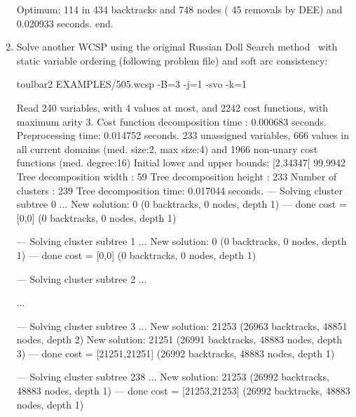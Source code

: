 \begin{enumerate}
{\begin{DoxyCode}
Optimum: 114 in 434 backtracks and 748 nodes ( 45 removals by DEE) and 0.020933 seconds.
end.
\end{DoxyCode}}
\item Solve another WCSP using the original Russian Doll Search method~\cite{Verfaillie96} with static variable
ordering (following problem file) and soft arc consistency:
\begin{DoxyCode}
	toulbar2 EXAMPLES/505.wcsp -B=3 -j=1 -svo -k=1
\end{DoxyCode}
{\scriptsize
\begin{DoxyCode}
Read 240 variables, with 4 values at most, and 2242 cost functions, with maximum arity 3.
Cost function decomposition time : 0.000683 seconds.
Preprocessing time: 0.014752 seconds.
233 unassigned variables, 666 values in all current domains (med. size:2, max size:4) and 1966 non-unary cost functions (med. degree:16)
Initial lower and upper bounds: [2,34347[ 99.9942%
Tree decomposition width  : 59
Tree decomposition height : 233
Number of clusters        : 239
Tree decomposition time: 0.017044 seconds.
--- Solving cluster subtree 0 ...
New solution: 0 (0 backtracks, 0 nodes, depth 1)
---  done  cost = [0,0] (0 backtracks, 0 nodes, depth 1)

--- Solving cluster subtree 1 ...
New solution: 0 (0 backtracks, 0 nodes, depth 1)
---  done  cost = [0,0] (0 backtracks, 0 nodes, depth 1)

--- Solving cluster subtree 2 ...

...

--- Solving cluster subtree 3 ...
New solution: 21253 (26963 backtracks, 48851 nodes, depth 2)
New solution: 21251 (26991 backtracks, 48883 nodes, depth 3)
---  done  cost = [21251,21251] (26992 backtracks, 48883 nodes, depth 1)

--- Solving cluster subtree 238 ...
New solution: 21253 (26992 backtracks, 48883 nodes, depth 1)
---  done  cost = [21253,21253] (26992 backtracks, 48883 nodes, depth 1)


\end{DoxyCode}}
\end{enumerate}
